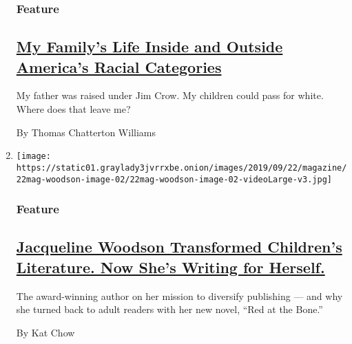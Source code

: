 \begin{enumerate}
  \hypertarget{feature-2}{%
  \subsubsection{Feature}\label{feature-2}}

  \hypertarget{my-familys-life-inside-and-outside-americas-racial-categories}{%
  \subsection{\texorpdfstring{\href{/2019/09/17/magazine/black-white-family-race.html}{My
  Family's Life Inside and Outside America's Racial
  Categories}}{My Family's Life Inside and Outside America's Racial Categories}}\label{my-familys-life-inside-and-outside-americas-racial-categories}}

  My father was raised under Jim Crow. My children could pass for white.
  Where does that leave me?

  By Thomas Chatterton Williams
\item
  \texttt{[image: https://static01.graylady3jvrrxbe.onion/images/2019/09/22/magazine/22mag-woodson-image-02/22mag-woodson-image-02-videoLarge-v3.jpg]}

  \hypertarget{feature-3}{%
  \subsubsection{Feature}\label{feature-3}}

  \hypertarget{jacqueline-woodson-transformed-childrens-literature-now-shes-writing-for-herself}{%
  \subsection{\texorpdfstring{\href{/2019/09/19/magazine/jacqueline-woodson-red-at-the-bone.html}{Jacqueline
  Woodson Transformed Children's Literature. Now She's Writing for
  Herself.}}{Jacqueline Woodson Transformed Children's Literature. Now She's Writing for Herself.}}\label{jacqueline-woodson-transformed-childrens-literature-now-shes-writing-for-herself}}

  The award-winning author on her mission to diversify publishing ---
  and why she turned back to adult readers with her new novel, ``Red at
  the Bone.''

  By Kat Chow
\end{enumerate}

